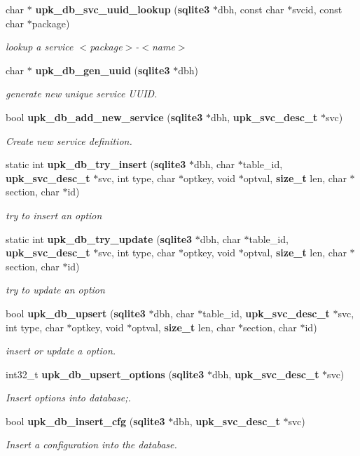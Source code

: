 \begin{DoxyCompactItemize}
char $\ast$ {\bf upk\_\-db\_\-svc\_\-uuid\_\-lookup} ({\bf sqlite3} $\ast$dbh, const char $\ast$svcid, const char $\ast$package)
\begin{DoxyCompactList}\small\item\em lookup a service $<$package$>$-\/$<$name$>$ \end{DoxyCompactList}\item 
char $\ast$ {\bf upk\_\-db\_\-gen\_\-uuid} ({\bf sqlite3} $\ast$dbh)
\begin{DoxyCompactList}\small\item\em generate new unique service UUID. \end{DoxyCompactList}\item 
bool {\bf upk\_\-db\_\-add\_\-new\_\-service} ({\bf sqlite3} $\ast$dbh, {\bf upk\_\-svc\_\-desc\_\-t} $\ast$svc)
\begin{DoxyCompactList}\small\item\em Create new service definition. \end{DoxyCompactList}\item 
static int {\bf upk\_\-db\_\-try\_\-insert} ({\bf sqlite3} $\ast$dbh, char $\ast$table\_\-id, {\bf upk\_\-svc\_\-desc\_\-t} $\ast$svc, int type, char $\ast$optkey, void $\ast$optval, {\bf size\_\-t} len, char $\ast$section, char $\ast$id)
\begin{DoxyCompactList}\small\item\em try to insert an option \end{DoxyCompactList}\item 
static int {\bf upk\_\-db\_\-try\_\-update} ({\bf sqlite3} $\ast$dbh, char $\ast$table\_\-id, {\bf upk\_\-svc\_\-desc\_\-t} $\ast$svc, int type, char $\ast$optkey, void $\ast$optval, {\bf size\_\-t} len, char $\ast$section, char $\ast$id)
\begin{DoxyCompactList}\small\item\em try to update an option \end{DoxyCompactList}\item 
bool {\bf upk\_\-db\_\-upsert} ({\bf sqlite3} $\ast$dbh, char $\ast$table\_\-id, {\bf upk\_\-svc\_\-desc\_\-t} $\ast$svc, int type, char $\ast$optkey, void $\ast$optval, {\bf size\_\-t} len, char $\ast$section, char $\ast$id)
\begin{DoxyCompactList}\small\item\em insert or update a option. \end{DoxyCompactList}\item 
int32\_\-t {\bf upk\_\-db\_\-upsert\_\-options} ({\bf sqlite3} $\ast$dbh, {\bf upk\_\-svc\_\-desc\_\-t} $\ast$svc)
\begin{DoxyCompactList}\small\item\em Insert options into database;. \end{DoxyCompactList}\item 
bool {\bf upk\_\-db\_\-insert\_\-cfg} ({\bf sqlite3} $\ast$dbh, {\bf upk\_\-svc\_\-desc\_\-t} $\ast$svc)
\begin{DoxyCompactList}\small\item\em Insert a configuration into the database. \end{DoxyCompactList}\end{DoxyCompactItemize}



